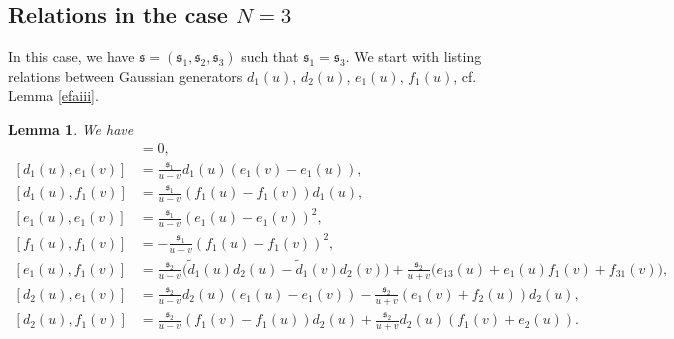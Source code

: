 \documentclass[11pt,reqno]{amsart}
\numberwithin{equation}{section}
\newtheorem{lem}[thm]{Lemma}
\theoremstyle{definition}
\theoremstyle{remark}
\newcommand{\tl}{\tilde}
\newcommand{\ka}{{\mathfrak s}}
\begin{document}
\subsection{Relations in the case $N=3$}
In this case, we have $\bm\ka=(\ka_1,\ka_2,\ka_3)$ such that $\ka_1=\ka_3$. We start with listing relations between Gaussian generators $d_1(u)$, $d_2(u)$, $e_1(u)$, $f_1(u)$, cf. Lemma \ref{efaiii}.
\begin{lem}
We have 
\begin{align}
[d_i(u),d_j(v)]&=0,\label{ddb3}\\
[d_1(u),e_1(v)]&=\frac{\ka_1}{u-v}d_1(u)(e_1(v)-e_1(u)),\label{d1e1b3}\\
[d_1(u),f_1(v)]&=\frac{\ka_1}{u-v}(f_1(u)-f_1(v))d_1(u),\label{d1f1b3}\\
[e_1(u),e_1(v)]&=\frac{\ka_1}{u-v}(e_1(u)-e_1(v))^2,\label{e1e1b3}\\
[f_1(u),f_1(v)]&=-\frac{\ka_1}{u-v}(f_1(u)-f_1(v))^2,\label{f1f1b3}\\
[e_1(u),f_1(v)]&=\frac{\ka_2}{u-v}\big(\tl d_1(u)d_2(u)-\tl d_1(v)d_2(v)\big)+\frac{\ka_2}{u+v}\big(e_{13}(u)+e_1(u)f_1(v)+f_{31}(v)\big),\label{e1f1b3}\\
[d_2(u),e_1(v)]&=\frac{\ka_2}{u-v}d_2(u)(e_1(u)-e_1(v))-\frac{\ka_2}{u+v}(e_1(v)+f_2(u))d_2(u),\label{d2e1b3}\\
[d_2(u),f_1(v)]&=\frac{\ka_2}{u-v}(f_1(v)-f_1(u))d_2(u)+\frac{\ka_2}{u+v}d_2(u)(f_1(v)+e_2(u)).\label{d2f1b3}
\end{align}
\end{lem}
\end{document}
